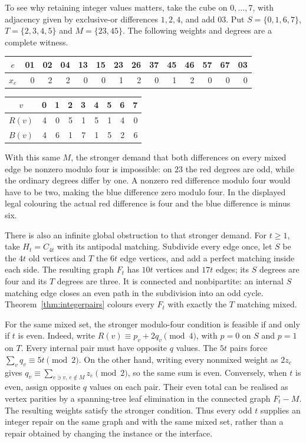 To see why retaining integer values matters, take the cube on
$0,\ldots,7$, with adjacency given by exclusive-or differences $1,2,4$,
and add $03$. Put $S=\{0,1,6,7\}$, $T=\{2,3,4,5\}$ and
$M=\{23,45\}$. The following weights and degrees are a complete witness.
\begin{center}\small
\begin{tabular}{c|rrrrrrrrrrrrr}
$e$&01&02&04&13&15&23&26&37&45&46&57&67&03\\\hline
$x_e$&0&2&2&0&0&1&2&0&1&2&0&0&0
\end{tabular}\par\medskip
\begin{tabular}{c|rrrrrrrr}
$v$&0&1&2&3&4&5&6&7\\\hline
$R(v)$&4&0&5&1&5&1&4&0\\
$B(v)$&4&6&1&7&1&5&2&6
\end{tabular}
\end{center}
With this same $M$, the stronger demand that both differences on every
mixed edge be nonzero modulo four is impossible: on $23$ the red degrees
are odd, while the ordinary degrees differ by one. A nonzero red
difference modulo four would have to be two, making the blue difference
zero modulo four. In the displayed legal colouring the actual red
difference is four and the blue difference is minus six.

There is also an infinite global obstruction to that stronger demand.
For $t\ge1$, take $H_t=C_{4t}$ with its antipodal matching. Subdivide
every edge once, let $S$ be the $4t$ old vertices and $T$ the $6t$ edge
vertices, and add a perfect matching inside each side. The resulting
graph $F_t$ has $10t$ vertices and $17t$ edges; its $S$ degrees are four
and its $T$ degrees are three. It is connected and nonbipartite: an
internal $S$ matching edge closes an even path in the subdivision into
an odd cycle. Theorem~\ref{thm:integerpairs} colours every $F_t$ with
exactly the $T$ matching mixed.

For the same mixed set, the stronger modulo-four condition is feasible
if and only if $t$ is even. Indeed, write
$R(v)\equiv p_v+2q_v\pmod4$, with $p=0$ on $S$ and $p=1$ on $T$.
Every internal pair must have opposite $q$ values. The $5t$ pairs force
$\sum_vq_v\equiv5t\pmod2$. On the other hand, writing every nonmixed
weight as $2z_e$ gives $q_v\equiv\sum_{e\ni v,\,e\notin M}z_e\pmod2$,
so the same sum is even. Conversely, when $t$ is even, assign opposite
$q$ values on each pair. Their even total can be realised as vertex
parities by a spanning-tree leaf elimination in the connected graph
$F_t-M$. The resulting weights satisfy the stronger condition.
Thus every odd $t$ supplies an integer repair on the same graph and
with the same mixed set, rather than a repair obtained by changing
the instance or the interface.

